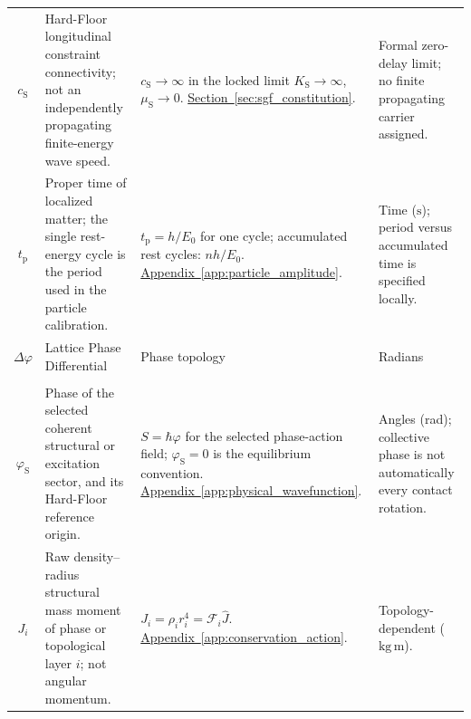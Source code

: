 \begin{longtable}{@{} c p{5.5cm} p{4cm} p{3.5cm} @{}}
$c_{\mathrm S}$ & {\raggedright Hard-Floor longitudinal constraint connectivity; not an independently propagating finite-energy wave speed.\par} & {\raggedright $c_{\mathrm S}\to\infty$ in the locked limit $K_{\mathrm S}\to\infty$, $\mu_{\mathrm S}\to0$. \newline \hyperref[sec:sgf_constitution]{Section~\ref*{sec:sgf_constitution}}.\par} & {\raggedright Formal zero-delay limit; no finite propagating carrier assigned.\par} \\

$t_{\mathrm p}$ & {\raggedright Proper time of localized matter; the single rest-energy cycle is the period used in the particle calibration.\par} & {\raggedright $t_{\mathrm p}=h/E_0$ for one cycle; accumulated rest cycles: $nh/E_0$. \newline \hyperref[app:particle_amplitude]{Appendix~\ref*{app:particle_amplitude}}.\par} & {\raggedright Time ($\mathrm s$); period versus accumulated time is specified locally.\par} \\

$\Delta\varphi$ & Lattice Phase Differential & Phase topology & Radians \\

\begin{tabular}[c]{@{}c@{}}$\varphi$ \\ $\varphi_{\mathrm S}$\end{tabular} & {\raggedright Phase of the selected coherent structural or excitation sector, and its Hard-Floor reference origin.\par} & {\raggedright $S=\hbar\varphi$ for the selected phase-action field; $\varphi_{\mathrm S}=0$ is the equilibrium convention. \newline \hyperref[app:physical_wavefunction]{Appendix~\ref*{app:physical_wavefunction}}.\par} & {\raggedright Angles (rad); collective phase is not automatically every contact rotation.\par} \\


$J_i$ & {\raggedright Raw density--radius structural mass moment of phase or topological layer $i$; not angular momentum.\par} & {\raggedright $J_i=\rho_i r_i^4=\mathcal F_i\widehat J$. \newline \hyperref[app:conservation_action]{Appendix~\ref*{app:conservation_action}}.\par} & {\raggedright Topology-dependent ($\mathrm{kg\,m}$).\par} \\


\end{longtable}

